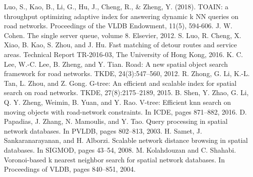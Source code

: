 \documentclass{ML}
\begin{document}
\begin{thebibliography}{20}
     Luo, S., Kao, B., Li, G., Hu, J., Cheng, R., \& Zheng, Y. (2018). TOAIN: a throughput optimizing adaptive index for answering dynamic k NN queries on road networks. Proceedings of the VLDB Endowment, 11(5), 594-606.
     J. W. Cohen. The single server queue, volume 8. Elsevier, 2012.
    S. Luo, R. Cheng, X. Xiao, B. Kao, S. Zhou, and J. Hu. Fast
    matching of detour routes and service areas. Technical
    Report TR-2016-03, The University of Hong Kong, 2016.
    K. C. Lee, W.-C. Lee, B. Zheng, and Y. Tian. Road: A new
    spatial object search framework for road networks. TKDE,
    24(3):547–560, 2012.
    R. Zhong, G. Li, K.-L. Tan, L. Zhou, and Z. Gong. G-tree:
    An efficient and scalable index for spatial search on road
    networks. TKDE, 27(8):2175–2189, 2015.
    B. Shen, Y. Zhao, G. Li, Q. Y. Zheng, Weimin, B. Yuan, and
    Y. Rao. V-tree: Efficient knn search on moving objects with
    road-network constraints. In ICDE, pages 871–882, 2016.
     D. Papadias, J. Zhang, N. Mamoulis, and Y. Tao. Query
    processing in spatial network databases. In PVLDB, pages
    802–813, 2003.
     H. Samet, J. Sankaranarayanan, and H. Alborzi. Scalable
    network distance browsing in spatial databases. In SIGMOD,
    pages 43–54, 2008.
     M. Kolahdouzan and C. Shahabi. Voronoi-based k
    nearest neighbor search for spatial network databases.
    In Proceedings of VLDB, pages 840–851, 2004.
\end{thebibliography}
\end{document}
